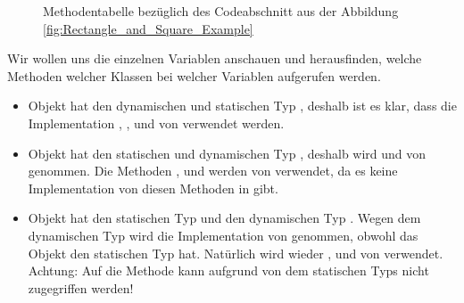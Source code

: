 \documentclass{tuda-pub}
\begin{document}
\begin{figure}[h]
    \caption{Methodentabelle bezüglich des Codeabschnitt aus der Abbildung \ref{fig:Rectangle_and_Square_Example}}
  \end{figure}

  \clearpage

  Wir wollen uns die einzelnen Variablen anschauen und herausfinden, welche Methoden welcher
  Klassen bei welcher Variablen aufgerufen werden.

  \begin{itemize}
    \item Objekt  hat den dynamischen und statischen Typ
    , deshalb ist es klar, dass die Implementation ,
    ,  und  von
     verwendet werden.
    \item  Objekt  hat den statischen und dynamischen Typ ,
    deshalb wird  und  von
     genommen. Die Methoden , 
    und werden von  verwendet, da es keine
    Implementation von diesen Methoden in  gibt.
    \item Objekt  hat den statischen Typ  und den
    dynamischen Typ . Wegen dem dynamischen Typ  wird die
    Implementation  von  genommen, obwohl das
    Objekt den statischen Typ  hat. Natürlich wird wieder
    ,  und von
     verwendet. Achtung: Auf die Methode 
    kann aufgrund von dem statischen Typs nicht zugegriffen werden!
  \end{itemize}
\end{document}
